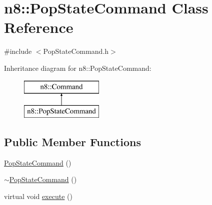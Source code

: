 \hypertarget{classn8_1_1_pop_state_command}{\section{n8\-:\-:Pop\-State\-Command Class Reference}
\label{classn8_1_1_pop_state_command}
}


{\ttfamily \#include $<$Pop\-State\-Command.\-h$>$}

Inheritance diagram for n8\-:\-:Pop\-State\-Command\-:\begin{figure}[H]
\begin{center}
\leavevmode
\includegraphics[height=2.000000cm]{classn8_1_1_pop_state_command}
\end{center}
\end{figure}
\subsection*{Public Member Functions}
\begin{DoxyCompactItemize}
\item 
\hyperlink{classn8_1_1_pop_state_command_a030daf82728757ac8124fa7d5bea5a9c}{Pop\-State\-Command} ()
\item 
\hyperlink{classn8_1_1_pop_state_command_a9cca8868fb822f469c4bcfec426a6963}{$\sim$\-Pop\-State\-Command} ()
\item 
virtual void \hyperlink{classn8_1_1_pop_state_command_aa17a7fa17704fe0ba20dcebde250e19b}{execute} ()
\end{DoxyCompactItemize}


